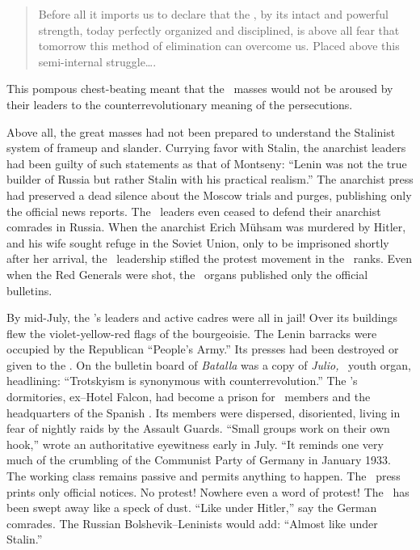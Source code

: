 \begin{quotation}
  Before all it imports us to declare that the \CNT\kn, by its intact and powerful strength, today perfectly organized and disciplined, is above all fear that tomorrow this method of elimination can overcome us. Placed above this semi-internal struggle\dots.
\end{quotation}

This pompous chest-beating meant that the \CNT\ masses would not be aroused by their leaders to the counterrevolutionary meaning of the persecutions.

Above all, the great masses had not been prepared to understand the Stalinist system of frameup and slander. Currying favor with Stalin, the anarchist leaders had been guilty of such statements as that of Montseny: ``Lenin was not the true builder of Russia but rather Stalin with his practical realism.\kn\kn'' The anarchist press had preserved a dead silence about the Moscow trials and purges, publishing only the official news reports. The \CNT\ leaders even ceased to defend their anarchist comrades in Russia. When the anarchist Erich M\"uhsam was murdered by Hitler\kn, and his wife sought refuge in the Soviet Union\indexUSSR, only to be imprisoned shortly after her arrival, the \CNT\ leadership stifled the protest movement in the \CNT\ ranks. Even when the Red Generals were shot, the \CNT\ organs published only the official bulletins.

By mid-July\kn, the \POUM’s leaders and active cadres were all in jail! Over its buildings flew the violet-yellow-red flags of the bourgeoisie. The Lenin barracks were occupied by the Republican ``People’s Army.\kn\kn'' Its presses had been destroyed or given to the \PSUC. On the bulletin board of \emph{Batalla} was a copy of \emph{Julio,} \PSUC\ youth organ, headlining: ``Trotskyism is synonymous with counterrevolution.'' The \POUM’s dormitories, ex--Hotel Falcon, had become a prison for \POUM\ members and the headquarters of the Spanish \GPU\indexGPU{}. Its members were dispersed, disoriented, living in fear of nightly raids by the Assault Guards. ``Small groups work on their own hook,\kn\kn'' wrote an authoritative eyewitness early in July. ``It reminds one very much of the crumbling of the Communist Party of Germany in January 1933. The working class remains passive and permits anything to happen. The \CNT\ press prints only official notices. No protest! Nowhere even a word of protest! The \POUM\ has been swept away like a speck of dust. “Like under Hitler{\indexAHitler},\kn\kn” say the German comrades. The Russian Bolshevik--Leninists would add: “Almost like under Stalin.\kn\kn”

